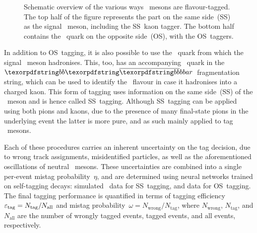 \begin{figure}[hp]
    \caption{
        Schematic overview of the various ways \bquark~mesons are flavour-tagged.
        The top half of the figure represents the part on the same side~(SS) as the signal \Bs~meson, including the SS~kaon tagger.
        The bottom half contains the \bquark~quark on the opposite side~(OS), with the OS~taggers.}
    \label{fig:BsDsK_TD_Tagging_Schematic}
\end{figure}

In addition to OS~tagging, it is also possible to use the \squark~quark from which the signal \Bs~meson hadronises.
This, too, has an accompanying \squarkbar~quark in the \({\bquark\bquarkbar}\)~fragmentation string, which can be used to identify the \BsorBsb~flavour in case it hadronises into a charged kaon.
This form of tagging uses information on the same side~(SS) of the \Bs~meson and is hence called SS~tagging.
Although SS~tagging can be applied using both pions and kaons, due to the presence of many final-state pions in the underlying event the latter is more pure, and as such mainly applied to tag \Bs~mesons.

Each of these procedures carries an inherent uncertainty on the tag decision, due to wrong track assignments, misidentified particles, as well as the aforementioned oscillations of neutral \bquark~mesons.
These uncertainties are combined into a single per-event mistag probability~\(\eta\), and are determined using neural networks trained on self-tagging decays: simulated \BsDsPi~data for SS~tagging, and \decay{\Bp}{\jpsi\Kp} data for OS~tagging.
The final tagging performance is quantified in terms of tagging efficiency~\({{\varepsilon_{\text{tag}}} = N_{\text{tag}} / N_{\text{all}}}\) and mistag probability~\({\omega = N_{\text{wrong}} / N_{\text{tag}}}\), where \(N_\text{wrong}\), \(N_\text{tag}\), and \(N_\text{all}\) are the number of wrongly tagged events, tagged events, and all events, respectively.

